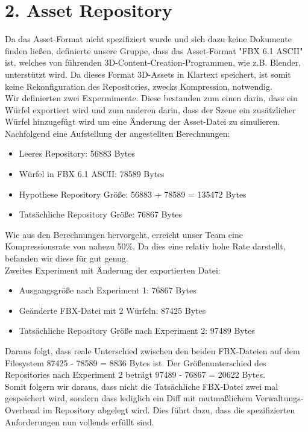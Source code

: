 \documentclass[a4paper, 11pt]{article} %
\begin{document}
\section*{2. Asset Repository}
Da das Asset-Format nicht spezifiziert wurde und sich dazu keine Dokumente finden ließen,
definierte unsere Gruppe, dass das Asset-Format "FBX 6.1 ASCII" ist, welches von führenden 
3D-Content-Creation-Programmen, wie z.B. Blender, unterstützt wird.
Da dieses Format 3D-Assets in Klartext speichert, ist somit keine Rekonfiguration des Repositories, zwecks Kompression, 
notwendig. \\
Wir definierten zwei Expermimente. Diese bestanden zum einen darin, dass ein Würfel exportiert wird und zum anderen 
darin, dass der Szene ein zusätzlicher Würfel hinzugefügt wird um eine Änderung der Asset-Datei zu simulieren.
Nachfolgend eine Aufstellung der angestellten Berechnungen:
\begin{itemize}
    \item Leeres Repository: 56883 Bytes
    \item Würfel in FBX 6.1 ASCII: 78589 Bytes
    \item Hypothese Repository Größe: 56883 + 78589 = 135472 Bytes
    \item Tatsächliche Repository Größe: 76867 Bytes
\end{itemize}
Wie aus den Berechnungen hervorgeht, erreicht unser Team eine Kompressionsrate von nahezu 50\%. Da dies eine relativ
hohe Rate darstellt, befanden wir diese für gut genug.\\
Zweites Experiment mit Änderung der exportierten Datei:
\begin{itemize}
    \item Ausgangsgröße nach Experiment 1: 76867 Bytes
    \item Geänderte FBX-Datei mit 2 Würfeln: 87425 Bytes
    \item Tatsächliche Repository Größe nach Experiment 2: 97489 Bytes
\end{itemize}
Daraus folgt, dass reale Unterschied zwischen den beiden FBX-Dateien auf dem Filesystem 87425 - 78589 = 8836 Bytes ist.
Der Größenunterschied des Repositories nach Experiment 2 beträgt 97489 - 76867 = 20622 Bytes. \\
Somit folgern wir daraus, dass nicht die Tatsächliche FBX-Datei zwei mal gespeichert wird, sondern dass lediglich ein
Diff mit mutmaßlichem Verwaltungs-Overhead im Repository abgelegt wird. Dies führt dazu, dass die spezifizierten 
Anforderungen nun vollends erfüllt sind.
\end{document}
